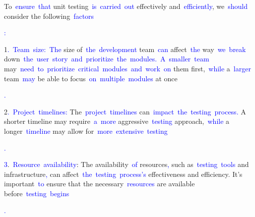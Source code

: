 \documentclass{article}
\begin{document}
\begin{tcolorbox}[colframe=black,colback=white]
{}To\textcolor{blue}{~ensure}\textcolor{blue}{~that} unit testing\textcolor{blue}{~is}\textcolor{blue}{~carried}\textcolor{blue}{~out} effectively and\textcolor{blue}{~efficiently}, we\textcolor{blue}{~should} consider the following\textcolor{blue}{~factors}\textcolor{blue}{:

}1\textcolor{blue}{.}\textcolor{blue}{~Team}\textcolor{blue}{~size}\textcolor{blue}{:}\textcolor{blue}{~The} size of\textcolor{blue}{~the}\textcolor{blue}{~development} team\textcolor{blue}{~can} affect\textcolor{blue}{~the} way\textcolor{blue}{~we}\textcolor{blue}{~break} down\textcolor{blue}{~the}\textcolor{blue}{~user}\textcolor{blue}{~story}\textcolor{blue}{~and}\textcolor{blue}{~prioritize}\textcolor{blue}{~the}\textcolor{blue}{~modules}\textcolor{blue}{.}\textcolor{blue}{~A}\textcolor{blue}{~smaller}\textcolor{blue}{~team} may\textcolor{blue}{~need}\textcolor{blue}{~to}\textcolor{blue}{~prioritize}\textcolor{blue}{~critical}\textcolor{blue}{~modules}\textcolor{blue}{~and}\textcolor{blue}{~work}\textcolor{blue}{~on} them first,\textcolor{blue}{~while} a\textcolor{blue}{~larger} team\textcolor{blue}{~may} be able to focus\textcolor{blue}{~on}\textcolor{blue}{~multiple}\textcolor{blue}{~modules} at once\textcolor{blue}{.

}2\textcolor{blue}{.}\textcolor{blue}{~Project}\textcolor{blue}{~timelines}\textcolor{blue}{:} The\textcolor{blue}{~project}\textcolor{blue}{~timelines} can\textcolor{blue}{~impact}\textcolor{blue}{~the}\textcolor{blue}{~testing}\textcolor{blue}{~process}\textcolor{blue}{.} A shorter timeline may require\textcolor{blue}{~a}\textcolor{blue}{~more} aggressive\textcolor{blue}{~testing} approach,\textcolor{blue}{~while} a longer\textcolor{blue}{~timeline} may allow for\textcolor{blue}{~more}\textcolor{blue}{~extensive}\textcolor{blue}{~testing}\textcolor{blue}{.

}\textcolor{blue}{3}.\textcolor{blue}{~Resource}\textcolor{blue}{~availability}: The availability\textcolor{blue}{~of} resources\textcolor{blue}{,} such as\textcolor{blue}{~testing}\textcolor{blue}{~tools} and infrastructure\textcolor{blue}{,} can affect\textcolor{blue}{~the}\textcolor{blue}{~testing}\textcolor{blue}{~process}\textcolor{blue}{'s} effectiveness and efficiency. It's important\textcolor{blue}{~to} ensure that the necessary\textcolor{blue}{~resources} are available before\textcolor{blue}{~testing}\textcolor{blue}{~begins}\textcolor{blue}{.

}
\end{tcolorbox}
\end{document}
